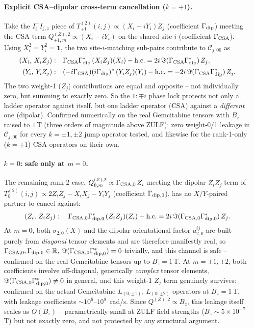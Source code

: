 \documentclass[11pt]{article}
\newcommand{\calC}{\mathcal{C}}
\begin{document}
\paragraph{Explicit CSA--dipolar cross-term cancellation ($k=+1$).} Take the $I_i^+I_{j,z}$ piece of $T^{(2)}_{+1}(i,j)\propto(X_i+iY_i)Z_j$ (coefficient $\Gamma_{\rm dip}$) meeting the CSA term $Q^{(Z),2}_{+1,m}\propto(X_i-iY_i)$ on the shared site $i$ (coefficient $\Gamma_{\rm CSA}$). Using $X_i^2=Y_i^2=\mathbf1$, the two site-$i$-matching sub-pairs contribute to $\calC_{j,00}$ as
\begin{align}
    (X_i,\,X_iZ_j):&\quad \Gamma_{\rm CSA}\Gamma_{\rm dip}^*\,(X_iZ_j)(X_i) - \text{h.c.} = 2i\,\Im(\Gamma_{\rm CSA}\Gamma_{\rm dip}^*)\,Z_j,\\
    (Y_i,\,Y_iZ_j):&\quad (-i\Gamma_{\rm CSA})(i\Gamma_{\rm dip})^*\,(Y_iZ_j)(Y_i) - \text{h.c.} = -2i\,\Im(\Gamma_{\rm CSA}\Gamma_{\rm dip}^*)\,Z_j.
\end{align}
The two weight-1 ($Z_j$) contributions are equal and opposite -- not individually zero, but summing to exactly zero. So the $1{:}\mp i$ phase lock protects not only a ladder operator against itself, but one ladder operator (CSA) against a \emph{different} one (dipolar). Confirmed numerically on the real Gemcitabine tensors with $B_z$ raised to $1\,$T (three orders of magnitude above ZULF): zero weight-0/1 leakage in $\calC_{j,00}$ for every $k=\pm1,\pm2$ jump operator tested, and likewise for the rank-1-only ($k=\pm1$) CSA operators on their own.

\paragraph{$k=0$: safe only at $m=0$.} The remaining rank-2 case, $Q^{(Z),2}_{0,m}\propto\Gamma_{\rm CSA,0}\,Z_i$ meeting the dipolar $Z_iZ_j$ term of $T^{(2)}_0(i,j)\propto2Z_iZ_j-X_iX_j-Y_iY_j$ (coefficient $\Gamma_{\rm dip,0}$), has no $X/Y$-paired partner to cancel against:
\begin{equation}
    (Z_i,\,Z_iZ_j):\quad \Gamma_{\rm CSA,0}\Gamma_{\rm dip,0}^*\,(Z_iZ_j)(Z_i)-\text{h.c.} = 2i\,\Im(\Gamma_{\rm CSA,0}\Gamma_{\rm dip,0}^*)\,Z_j.
\end{equation}
At $m=0$, both $\sigma_{2,0}(X)$ and the dipolar orientational factor $a_{2,0}^{ij}$ are built purely from \emph{diagonal} tensor elements and are therefore manifestly real, so $\Gamma_{\rm CSA,0},\Gamma_{\rm dip,0}\in\mathbb{R}$, $\Im(\Gamma_{\rm CSA,0}\Gamma_{\rm dip,0}^*)=0$ trivially, and this channel is safe -- confirmed on the real Gemcitabine tensors up to $B_z=1\,$T. At $m=\pm1,\pm2$, both coefficients involve off-diagonal, generically \emph{complex} tensor elements, $\Im(\Gamma_{\rm CSA,0}\Gamma_{\rm dip,0}^*)\neq0$ in general, and this weight-1 $Z_j$ term genuinely survives: confirmed on the actual Gemcitabine $L_{(0,\pm1)}$, $L_{(0,\pm2)}$ operators at $B_z=1\,$T, with leakage coefficients $\sim10^6$--$10^8$~rad/s. Since $Q^{(Z),2}\propto B_z$, this leakage itself scales as $O(B_z)$ -- parametrically small at ZULF field strengths ($B_z\sim5\times10^{-7}\,$T) but not exactly zero, and not protected by any structural argument.
\end{document}
